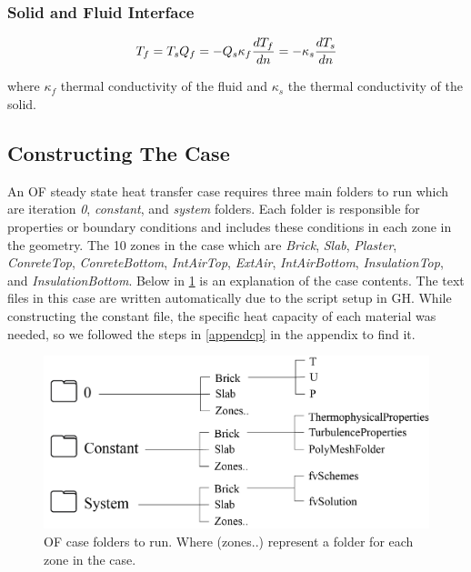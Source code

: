 \subsubsection{Solid and Fluid Interface}
\begin{equation}
T_f = T_s  \\
Q_f = -Q_s  \\
\kappa_f \frac{d T_f}{d n} = -\kappa_s \frac{d T_s}{d n} 
\end{equation}

where \( \kappa_f \) thermal conductivity of the fluid and \( \kappa_s \)  the thermal conductivity of the solid.


\subsection{Constructing The Case}    
An OF steady state heat transfer case requires three main folders to run which are iteration \textit{0}, \textit{constant}, and \textit{system} folders. Each folder is responsible for properties or boundary conditions and includes these conditions in each zone in the geometry. The 10 zones in the case which are \textit{Brick}, \textit{Slab}, \textit{Plaster}, \textit{ConreteTop}, \textit{ConreteBottom}, \textit{IntAirTop}, \textit{ExtAir}, \textit{IntAirBottom}, \textit{InsulationTop}, and \textit{InsulationBottom}. Below in \cref{constc} is an explanation of the case contents. The text files in this case are written automatically due to the script setup in GH. While constructing the constant file, the specific heat capacity of each material was needed, so we followed the steps in \ref{appendcp} in the appendix to find it.






\begin{figure}[H]
\centering
\includegraphics[width=0.77\columnwidth]{Figures/constc.png}
\hspace{0.7cm}
\caption[OF Case Contents]{OF case folders to run. Where (zones..) represent a folder for each zone in the case.}
\label{constc}
\end{figure}



